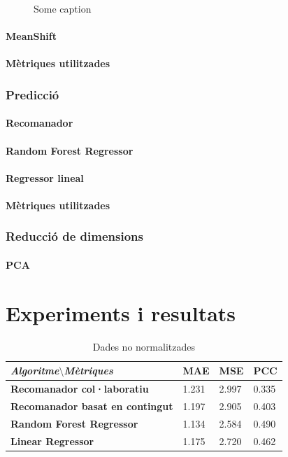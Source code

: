\documentclass[11pt,a4paper,catalan]{article}
\begin{document}
\begin{figure}[h]
\centering
{}
\caption{Some caption}
\label{nicefigure}
\end{figure}

\paragraph{MeanShift}
\paragraph{Mètriques utilitzades}
\newpage
\subsubsection{Predicció}
\paragraph{Recomanador}
\paragraph{Random Forest Regressor}
\paragraph{Regressor lineal}
\paragraph{Mètriques utilitzades}
\subsubsection{Reducció de dimensions}
\paragraph{PCA}
\newpage

\section{Experiments i resultats}

\begin{table}[h]
\centering
\begin{tabular}{@{}llll@{}}
\toprule
\textit{\textbf{Algoritme$\setminus$Mètriques}}   & \textbf{MAE} & \textbf{MSE} & \textbf{PCC} \\ \midrule
\textbf{Recomanador col·laboratiu}      & 1.231        & 2.997        & 0.335        \\
\textbf{Recomanador basat en contingut} & 1.197        & 2.905        & 0.403        \\
\textbf{Random Forest Regressor}        & 1.134        & 2.584        & 0.490        \\
\textbf{Linear Regressor}               & 1.175        & 2.720        & 0.462        \\ \bottomrule
\end{tabular}
\caption{Dades no normalitzades}
\end{table}
\end{document}
